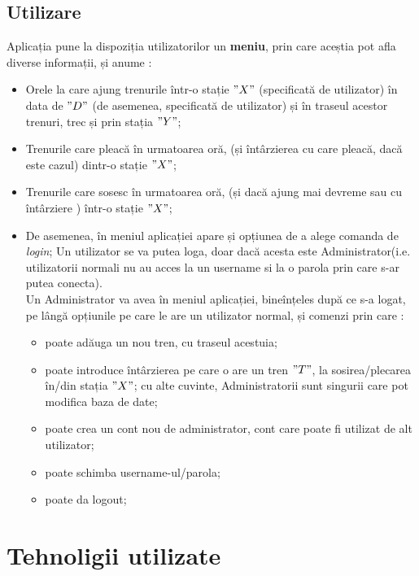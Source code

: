 \documentclass[runningheads]{llncs}
\begin{document}
	\subsection{Utilizare}
	Aplicația pune la dispoziția utilizatorilor un \textbf{meniu}, prin care aceștia pot afla diverse informații, și anume :
	\begin{itemize}
		\itemsep0em
		\item Orele la care ajung trenurile într-o stație $" X "$ (specificată de utilizator) în data de $"D"$ (de asemenea, specificată de utilizator) și în traseul acestor trenuri, trec și prin stația $"Y"$;
		\item Trenurile care pleacă în urmatoarea oră, (și întârzierea cu care pleacă, dacă este cazul) dintr-o stație $"X"$;
		\item Trenurile care sosesc în urmatoarea oră, (și dacă ajung mai devreme sau cu întârziere ) într-o stație $"X"$;
		\item De asemenea, în meniul aplicației apare și opțiunea de a alege comanda de \textit{login};
		Un utilizator se va putea loga, doar dacă acesta este Administrator(i.e. utilizatorii normali nu au acces la un username si la o parola prin care s-ar putea conecta).\\
		Un Administrator va avea în meniul aplicației, bineînțeles după ce s-a logat, pe lângă opțiunile pe care le are un utilizator normal, și comenzi prin care :
		\begin{itemize}
			\itemsep0em
			\item poate adăuga un nou tren, cu traseul acestuia;
			\item poate introduce întârzierea pe care o are un tren $"T"$, la sosirea/plecarea în/din stația $"X"$; cu alte cuvinte, Administratorii sunt singurii care pot modifica baza de date;
			\item poate crea un cont nou de administrator, cont care poate fi utilizat de alt utilizator;
			\item poate schimba username-ul/parola;
			\item poate da logout;
		\end{itemize}
	\end{itemize}
	\section{Tehnoligii utilizate}
\end{document}
